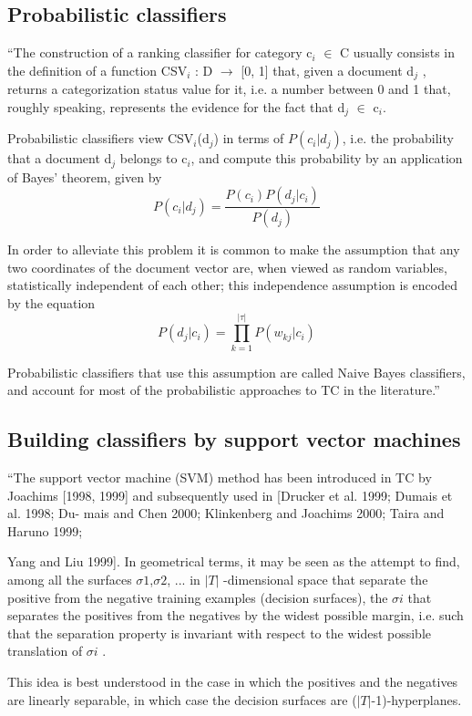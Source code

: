 \subsection{Probabilistic classifiers}
``The construction of a ranking classifier for category c$_{i}$ $\in$ C usually
consists in the definition of a function CSV$_{i}$ : D $\rightarrow$ [0, 1] 
that, given a document d$_{j}$ , returns a categorization status value for it, 
i.e. a number between 0 and 1 that, roughly speaking, represents the evidence 
for the fact that d$_{j}$ $\in$ c$_{i}$.

Probabilistic classifiers view CSV$_{i}$(d$_{j}$) in terms of $P(c_{i} | d_{j})$, 
i.e. the probability that a document d$_{j}$ belongs to c$_{i}$, and compute this 
probability by an application of Bayes’ theorem, given by 
\[ P(c_{i}|d_{j}) = \frac{P(c_{i})P(d_{j}|c_{i})}{P(d_{j})} \]

In order to alleviate this problem it is common to make the assumption that 
any two coordinates of the document vector are, when viewed as random variables, 
statistically independent of each other; this independence assumption is 
encoded by the equation
\[ P(d_{j}|c_{i}) = \prod_{k=1}^{|\tau|} P(w_{kj}|c_{i}) \]

Probabilistic classifiers that use this assumption are called Naive Bayes classifiers, 
and account for most of the probabilistic approaches to TC in the literature.''\cite{Sebastiani2002}

\subsection{Building classifiers by support vector machines}
``The support vector machine (SVM) method has been introduced in TC by Joachims 
[1998, 1999] and subsequently used in [Drucker et al. 1999; Dumais et al. 1998; 
Du- mais and Chen 2000; Klinkenberg and Joachims 2000; Taira and Haruno 1999;

Yang and Liu 1999]. In geometrical terms, it may be seen as the attempt to
find, among all the surfaces $\sigma 1$,$ \sigma 2$, ... in $|T|$ -dimensional
space that separate the positive from the negative training examples (decision
surfaces), the $\sigma i$ that separates the positives from the negatives by the 
widest possible margin, i.e. such that the separation property is invariant with 
respect to the widest possible translation of $\sigma i$ .

This idea is best understood in the case in which the positives and the
negatives are linearly separable, in which case the decision surfaces are
($|T|$-1)-hyperplanes.

